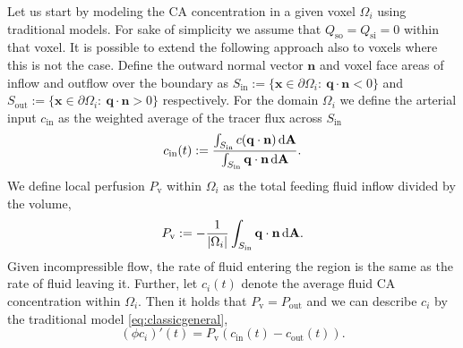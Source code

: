 \documentclass[final,5p,times,twocolumn]{elsarticle}
\begin{document}
	Let us start by modeling the CA concentration in a given voxel $\Omega_i$ using traditional models.
	For sake of simplicity we assume that $Q_{\mathrm{so}} = Q_{\mathrm{si}} = 0$ within that voxel.
	It is possible to extend the following approach also to voxels where this is not the case.
	Define the outward normal vector $\mathbf{n}$ and voxel face areas of inflow and outflow over the boundary as $S_{\mathrm{in}} := \{ \mathbf{x} \in \partial \Omega_i: \ \mathbf{q} \cdot \mathbf{n} < 0 \}$ and $S_{\mathrm{out}}:= \{ \mathbf{x} \in \partial \Omega_i: \ \mathbf{q} \cdot \mathbf{n} > 0 \}$ respectively.
	For the domain $\Omega_i$ we define the arterial input $c_{\mathrm{in}}$ as the weighted average of the tracer flux across $S_{\mathrm{in}}$
	\begin{equation}\label{eq:cin}
	 	c_{\mathrm{in}}(t):= \frac{\int_{S_{\mathrm{in}}}c (\mathbf{q} \cdot \mathbf{n}) \,\mathrm{d} \mathbf{A}}{\int_{S_{\mathrm{in}}} \mathbf{q} \cdot \mathbf{n} \,\mathrm{d} \mathbf{A}}.
	\end{equation}
	We define local perfusion $P_{\mathrm{v}}$ within $\Omega_i$ as the total feeding fluid inflow divided by the volume,
	\begin{equation}\label{eq:perflocal}
		P_{\mathrm{v}} :=-\frac{1}{|\Omega_i|}\int_{S_{\mathrm{in}}} \mathbf{q} \cdot \mathbf{n} \,\mathrm{d} \mathbf{A}.
	\end{equation}
	Given incompressible flow, the rate of fluid entering the region is the same as the rate of fluid leaving it. 
	Further, let $c_i(t)$ denote the average fluid CA concentration within $\Omega_i$.
	Then it holds that $P_{\mathrm{v}}=P_{\mathrm{out}}$ and we can describe $c_i$ by the traditional model \eqref{eq:classicgeneral},
	\begin{equation}\label{eq:singlevoxel}
		(\phi c_i)'(t)  = P_{\mathrm{v}} (c_\mathrm{in}(t)  - c_\mathrm{out}(t)).
	\end{equation}
\end{document}
